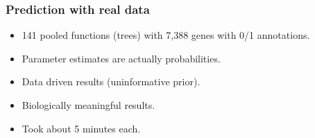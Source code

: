 \documentclass[aspectratio=169, 9pt]{beamer}\usepackage[]{graphicx}\usepackage[]{color}
\begin{document}
\begin{frame}[t]
\frametitle{Prediction with real data}

\begin{minipage}{.39\linewidth}
\begin{table}[ht]
\centering
{}
\caption{Parameter estimates using different priors.} 
\end{table}
%
\end{minipage}
\begin{minipage}{.59\linewidth}
\begin{itemize}[<+->]
\item 141 pooled functions (trees) with 7,388 genes with 0/1 annotations.
\item Parameter estimates are actually probabilities.
\item Data driven results (uninformative prior).
\item \textcolor{usccardinal}{Biologically meaningful results.}
\item Took about 5 minutes each.
\end{itemize}
\end{minipage}

\end{frame}
\end{document}
